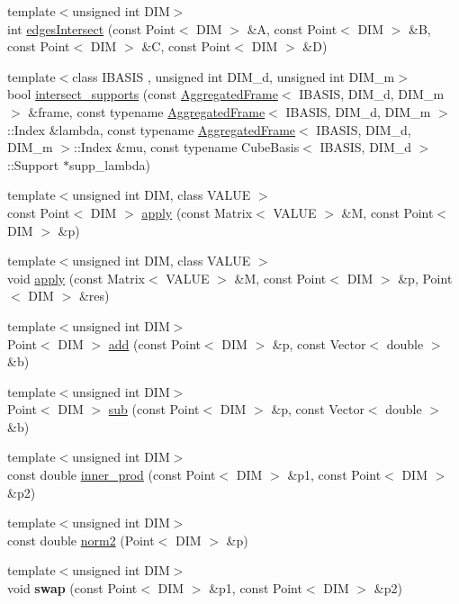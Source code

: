 \begin{CompactItemize}
\item 
{\footnotesize template$<$unsigned int DIM$>$ }\\int \hyperlink{namespaceFrameTL_179a53ae796b31d73b591456b7e8240e}{edgesIntersect} (const Point$<$ DIM $>$ \&A, const Point$<$ DIM $>$ \&B, const Point$<$ DIM $>$ \&C, const Point$<$ DIM $>$ \&D)
\item 
{\footnotesize template$<$class IBASIS , unsigned int DIM\_\-d, unsigned int DIM\_\-m$>$ }\\bool \hyperlink{namespaceFrameTL_0b6d3a80be9f0dd032527c3c17ce3f62}{intersect\_\-supports} (const \hyperlink{classFrameTL_1_1AggregatedFrame}{AggregatedFrame}$<$ IBASIS, DIM\_\-d, DIM\_\-m $>$ \&frame, const typename \hyperlink{classFrameTL_1_1AggregatedFrame}{AggregatedFrame}$<$ IBASIS, DIM\_\-d, DIM\_\-m $>$::Index \&lambda, const typename \hyperlink{classFrameTL_1_1AggregatedFrame}{AggregatedFrame}$<$ IBASIS, DIM\_\-d, DIM\_\-m $>$::Index \&mu, const typename CubeBasis$<$ IBASIS, DIM\_\-d $>$::Support $\ast$supp\_\-lambda)
\item 
{\footnotesize template$<$unsigned int DIM, class VALUE $>$ }\\const Point$<$ DIM $>$ \hyperlink{namespaceFrameTL_110b0b11455f5d648c2cb3a7866f3900}{apply} (const Matrix$<$ VALUE $>$ \&M, const Point$<$ DIM $>$ \&p)
\item 
{\footnotesize template$<$unsigned int DIM, class VALUE $>$ }\\void \hyperlink{namespaceFrameTL_7f2d7a0a9f79b15e8d82ff8363d06bb5}{apply} (const Matrix$<$ VALUE $>$ \&M, const Point$<$ DIM $>$ \&p, Point$<$ DIM $>$ \&res)
\item 
{\footnotesize template$<$unsigned int DIM$>$ }\\Point$<$ DIM $>$ \hyperlink{namespaceFrameTL_fd9af4210f87f330a600bdba74ca3f6d}{add} (const Point$<$ DIM $>$ \&p, const Vector$<$ double $>$ \&b)
\item 
{\footnotesize template$<$unsigned int DIM$>$ }\\Point$<$ DIM $>$ \hyperlink{namespaceFrameTL_ab03f9658bfef63434301affb3b5803a}{sub} (const Point$<$ DIM $>$ \&p, const Vector$<$ double $>$ \&b)
\item 
{\footnotesize template$<$unsigned int DIM$>$ }\\const double \hyperlink{namespaceFrameTL_b442ddca04900a00608a3963348b15bb}{inner\_\-prod} (const Point$<$ DIM $>$ \&p1, const Point$<$ DIM $>$ \&p2)
\item 
{\footnotesize template$<$unsigned int DIM$>$ }\\const double \hyperlink{namespaceFrameTL_6fd34de92145c0f42b41f9b36a379e9f}{norm2} (Point$<$ DIM $>$ \&p)
\item 
\hypertarget{namespaceFrameTL_d1c8aa47dd1f4024c97146dd88d48a72}{
{\footnotesize template$<$unsigned int DIM$>$ }\\void \textbf{swap} (const Point$<$ DIM $>$ \&p1, const Point$<$ DIM $>$ \&p2)}
\label{namespaceFrameTL_d1c8aa47dd1f4024c97146dd88d48a72}


\end{CompactItemize}
